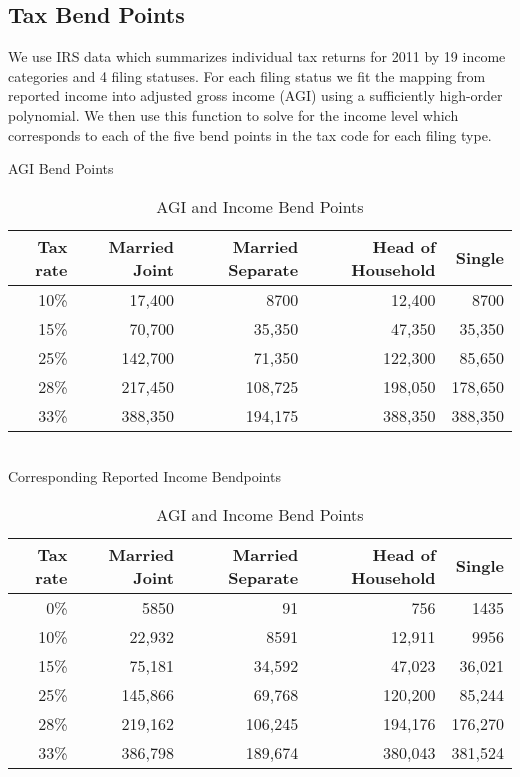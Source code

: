 \documentclass[letterpaper,12pt]{article}
\theoremstyle{definition}
\begin{document}
\begin{spacing}{1.5}
  \subsection{Tax Bend Points}
      We use IRS data which summarizes individual tax returns for 2011 by 19 income categories and 4 filing statuses.  For each filing status we fit the mapping from reported income into adjusted gross income (AGI) using a sufficiently high-order polynomial.  We then use this function to solve for the income level which corresponds to each of the five bend points in the tax code for each filing type.
      \begin{table}[ht]
        \caption{AGI and Income Bend Points}
        \label{Calib_Bend_Tab1}
        \centering
        AGI Bend Points
        \begin{tabular}{|r|r|r|r|r|} \hline 
          Tax rate & Married Joint & Married Separate & Head of Household & Single \\ \hline 
          10\% & 17,400 & 8700 & 12,400 & 8700 \\ \hline 
          15\% & 70,700 & 35,350 & 47,350 & 35,350 \\ \hline 
          25\% & 142,700 & 71,350 & 122,300 & 85,650 \\ \hline 
          28\% & 217,450 & 108,725 & 198,050 & 178,650 \\ \hline 
          33\% & 388,350 & 194,175 & 388,350 & 388,350 \\ \hline 
        \end{tabular}
        \\
        Corresponding Reported Income Bendpoints
        \begin{tabular}{|r|r|r|r|r|} \hline 
          Tax rate & Married Joint & Married Separate & Head of Household & Single \\ \hline 
          0\%  & 5850  & 91 & 756 & 1435 \\ \hline 
          10\% & 22,932 & 8591 & 12,911 & 9956 \\ \hline 
          15\% & 75,181 & 34,592 & 47,023 & 36,021 \\ \hline 
          25\% & 145,866 & 69,768 & 120,200 & 85,244 \\ \hline 
          28\% & 219,162 & 106,245 & 194,176 & 176,270 \\ \hline 
          33\% & 386,798 & 189,674 & 380,043 & 381,524 \\ \hline 
        \end{tabular}
      \end{table}


\end{spacing}
\end{document}
